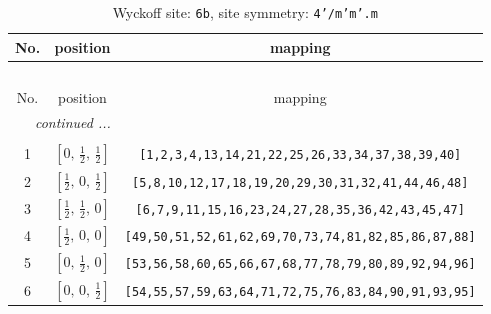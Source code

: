 \documentclass[fleqn,8pt]{jsarticle}
\begin{document}
\begin{longtable}{ccc}
\caption{Wyckoff site: {\tt 6b}, site symmetry: {\tt 4'/m'm'.m}}
 \\
 \hline \hline
No. & position & mapping \\ \hline \endfirsthead

\multicolumn{2}{l}{\tablename\ \thetable{}} \\
 \hline \hline
No. & position & mapping \\ \hline \endhead

 \hline \hline
\multicolumn{2}{r}{\footnotesize\it continued ...} \\ \endfoot

 \hline \hline
\multicolumn{2}{r}{} \\ \endlastfoot

1 & $\left[ 0,\, \frac{1}{2},\, \frac{1}{2} \right]$ & {\tt [1,2,3,4,13,14,21,22,25,26,33,34,37,38,39,40]} \\ \hline
2 & $\left[ \frac{1}{2},\, 0,\, \frac{1}{2} \right]$ & {\tt [5,8,10,12,17,18,19,20,29,30,31,32,41,44,46,48]} \\ \hline
3 & $\left[ \frac{1}{2},\, \frac{1}{2},\, 0 \right]$ & {\tt [6,7,9,11,15,16,23,24,27,28,35,36,42,43,45,47]} \\ \hline
4 & $\left[ \frac{1}{2},\, 0,\, 0 \right]$ & {\tt [49,50,51,52,61,62,69,70,73,74,81,82,85,86,87,88]} \\ \hline
5 & $\left[ 0,\, \frac{1}{2},\, 0 \right]$ & {\tt [53,56,58,60,65,66,67,68,77,78,79,80,89,92,94,96]} \\ \hline
6 & $\left[ 0,\, 0,\, \frac{1}{2} \right]$ & {\tt [54,55,57,59,63,64,71,72,75,76,83,84,90,91,93,95]} \\
\end{longtable}
\renewcommand{\arraystretch}{1.2}
\end{document}
